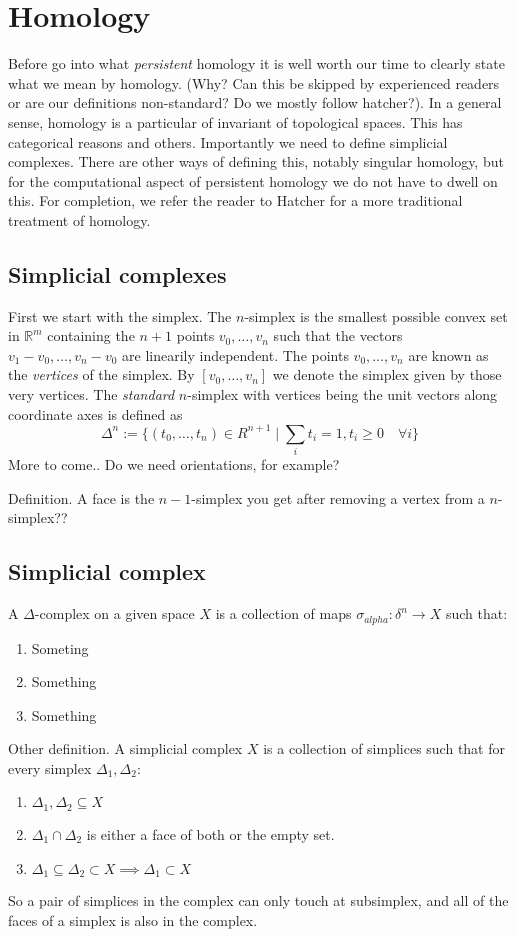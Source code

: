 \chapter{Homology}
Before go into what \textit{persistent} homology it is well worth our time to clearly state what we mean by homology. (Why? Can this be skipped by experienced readers or are our definitions non-standard? Do we mostly follow hatcher?). In a general sense, homology is a particular of invariant of topological spaces. This has categorical reasons and others.
Importantly we need to define simplicial complexes. There are other ways of defining this, notably singular homology, but for the computational aspect of persistent homology we do not have to dwell on this. For completion, we refer the reader to Hatcher for a more traditional treatment of homology.

\section{Simplicial complexes}
First we start with the simplex.
The $n$-simplex is the smallest possible convex set in $\mathbb{R}^{m}$ containing the $n+1$ points $v_{0},\dots,v_{n}$ such that the vectors $v_{1}-v_{0}, \dots, v_{n} - v_{0}$ are linearily independent. The points $v_{0},\dots,v_{n}$ are known as the \textit{vertices} of the simplex.
By $[v_{0},\dots,v_{n}]$ we denote the simplex given by those very vertices. The \textit{standard} $n$-simplex with vertices being the unit vectors along coordinate axes is defined as
\[ \Delta^{n} := \{ (t_{0}, \dots, t_{n}) \in R^{n+1} \mid \sum_{i} t_{i} = 1, t_{i} \geq 0 \quad \forall i \}

\]
More to come.. Do we need orientations, for example?

Definition. A face is the $n-1$-simplex you get after removing a vertex from a $n$-simplex??

\section{Simplicial complex}
A $\Delta$-complex on a given space $X$ is a collection of maps $\sigma_{alpha}: \delta^{n} \to X$ such that:
\begin{enumerate}
  \item Someting
  \item Something
        \item Something
\end{enumerate}

Other definition. A simplicial complex $X$ is a collection of simplices such that for every simplex $\Delta_{1}, \Delta_{2}$:
\begin{enumerate}
        \item $\Delta_{1}, \Delta_{2} \subseteq X$
  \item $\Delta_{1} \cap \Delta_{2}$ is either a face of both or the empty set.
  \item $\Delta_{1} \subseteq \Delta_{2} \subset X \implies \Delta_{1} \subset X $
\end{enumerate}
So a pair of simplices in the complex can only touch at subsimplex, and all of the faces of a simplex is also in the complex.

